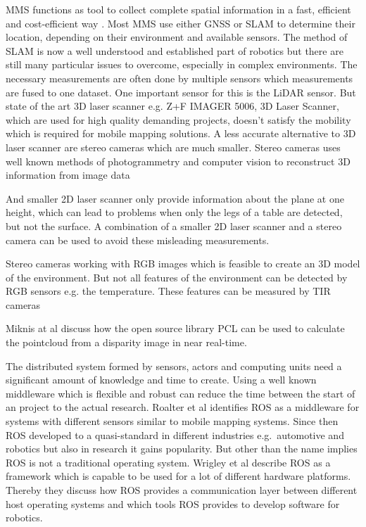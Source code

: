 \ac{MMS} functions as tool to collect complete spatial information in a fast, efficient and cost-efficient way \cite{El-Sheimy2005}.
Most \ac{MMS} use either \ac{GNSS} or \ac{SLAM} to determine their location, depending on their environment and available sensors.
The method of \ac{SLAM} is now a well understood and established part of robotics but there are still many particular issues to overcome, especially in complex environments\cite{durrant-Whyte2006}.
The necessary measurements are often done by multiple sensors which measurements are fused to one dataset.
One important sensor for this is the \ac{LiDAR} sensor.
But state of the art 3D laser scanner e.g. Z+F IMAGER\circledR{} 5006, 3D Laser Scanner, which are used for high quality demanding projects\cite{Abmayr_calibrationand}, doesn't satisfy the mobility which is required for mobile mapping solutions.
A less accurate alternative to 3D laser scanner are stereo cameras which are much smaller.
Stereo cameras uses well known methods of photogrammetry and computer vision to reconstruct 3D information from image data\cite{dagstuhl-11-mayer}\cite{Pollefeys07}

And smaller 2D laser scanner only provide information about the plane at one height, which can lead to problems when only the legs of a table are detected, but not the surface.
A combination of a smaller 2D laser scanner and a stereo camera can be used to avoid these misleading measurements\cite{DBLP:journals/jise/LinCDW12}.

Stereo cameras working with RGB images which is feasible to create an 3D model of the environment.
But not all features of the environment can be detected by RGB sensors e.g. the temperature.
These features can be measured by \ac{TIR} cameras

Miknis at al discuss how the open source library \ac{PCL} can be used to calculate the pointcloud from a disparity image in near real-time\cite{miknis2015}.

The distributed system formed by sensors, actors and computing units need a significant amount of knowledge and time to create.
Using a well known middleware which is flexible and robust can reduce the time between the start of an project to the actual research.
Roalter et al\cite{roalter2011developing} identifies \ac{ROS} as a middleware for systems with different sensors similar to mobile mapping systems.
Since then \ac{ROS} developed to a quasi-standard in different industries e.g.\ automotive and robotics but also in research it gains popularity.
But other than the name implies \ac{ROS} is not a traditional operating system.
Wrigley et al describe \ac{ROS} as a framework which is capable to be used for a lot of different hardware platforms.
Thereby they discuss how \ac{ROS} provides a communication layer between different host operating systems and which tools \ac{ROS} provides to develop software for robotics.\cite{Quigley2009ROSAO}


